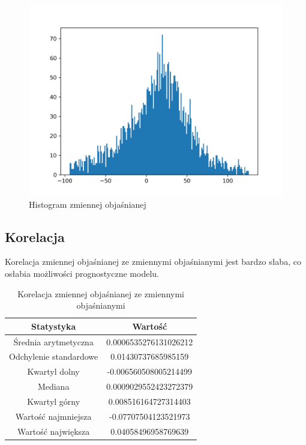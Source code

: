 \documentclass{article}
\begin{document}
\begin{figure}[h!]
    \includegraphics[width=\linewidth]{source/YHistogram.png}
    \caption{Histogram zmiennej objaśnianej}
\end{figure}

\newpage
\subsection{Korelacja}
Korelacja zmiennej objaśnianej ze zmiennymi objaśnianymi jest bardzo słaba, co osłabia możliwości prognostyczne modelu.
\begin{table}[h!]
    \begin{center}
    \begin{tabular}{|c | c|} 
    \hline
    Statystyka & Wartość \\
    \hline\hline
    Średnia arytmetyczna & 0.0006535276131026212 \\ 
    \hline
    Odchylenie standardowe & 0.01430737685985159 \\
    \hline
    Kwartyl dolny & -0.006560508005214499 \\
    \hline
    Mediana & 0.0009029552423272379 \\
    \hline
    Kwartyl górny & 0.008516164727314403 \\
    \hline
    Wartość najmniejsza & -0.07707504123521973 \\
    \hline
    Wartość największa & 0.04058496958769639 \\
    \hline
    \end{tabular}
    \end{center}
   \caption{Korelacja zmiennej objaśnianej ze zmiennymi objaśnianymi}
\end{table}
\end{document}
